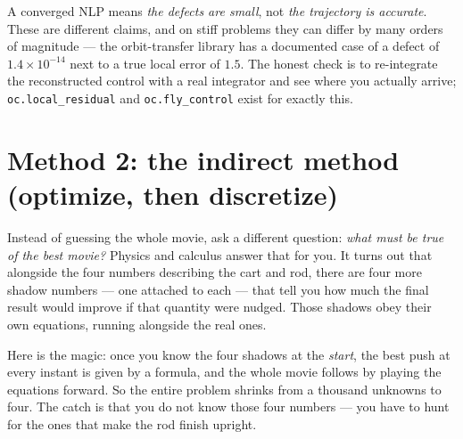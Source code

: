 \documentclass[11pt]{article}
\newcommand{\file}[1]{\texttt{#1}}
\begin{document}
\begin{warn}
A converged NLP means \emph{the defects are small}, not \emph{the trajectory is
accurate}. These are different claims, and on stiff problems they can differ by
many orders of magnitude --- the orbit-transfer library has a documented case of
a defect of $1.4\times10^{-14}$ next to a true local error of $1.5$. The honest
check is to re-integrate the reconstructed control with a real integrator and
see where you actually arrive; \file{oc.local\_residual} and
\file{oc.fly\_control} exist for exactly this.
\end{warn}

\section{Method 2: the indirect method (optimize, then discretize)}

\begin{eli}
Instead of guessing the whole movie, ask a different question: \emph{what must
be true of the best movie?} Physics and calculus answer that for you. It turns
out that alongside the four numbers describing the cart and rod, there are four
more shadow numbers --- one attached to each --- that tell you how much the final
result would improve if that quantity were nudged. Those shadows obey their own
equations, running alongside the real ones.

Here is the magic: once you know the four shadows at the \emph{start}, the best
push at every instant is given by a formula, and the whole movie follows by
playing the equations forward. So the entire problem shrinks from a thousand
unknowns to four. The catch is that you do not know those four numbers --- you
have to hunt for the ones that make the rod finish upright.
\end{eli}
\end{document}
